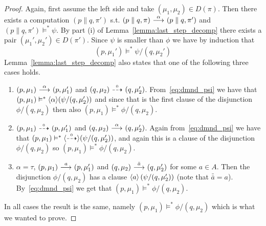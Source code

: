 \begin{proof}
    \par\nobreak
    \ltr Again, first assume the left side and take $(\mu_1,\mu_2)\in D(\pi)$. Then
    there exists a computation $(p\parallel q, \pi')$ s.t. $(p\parallel q, \pi) \ {\stackrel{{\alpha}}{\longrightarrow}}\ 
    (p\parallel q, \pi')$ and $(p\parallel q, \pi') \vDash^* \psi$.
    By part (i) of
    Lemma~\ref{lemma:last_step_decomp} there exists a pair $(\mu_1',\mu_2')\in D(\pi')$.
    Since $\psi$ is smaller than $\phi$ we have by induction that
    \begin{equation}\label{eq:dmnd_psi}
        (p,\mu_1') \vDash^* \psi / (q,\mu_2')
    \end{equation}
    Lemma~\ref{lemma:last_step_decomp} also states that one of the following three cases holds.
    \begin{enumerate}
        \item $(p,\mu_1)\ {\stackrel{{\alpha}}{\longrightarrow}}\ (p,\mu_1')$ and $(q,\mu_2)\ {\stackrel{_{0}}{\dashrightarrow}}\ (q,\mu_2')$.
            From~\eqref{eq:dmnd_psi} we have that $(p,\mu_1) \vDash^*
            \mbox{\ensuremath{\langle \alpha \rangle}}(\psi/(q,\mu_2'))$ and since that is the first clause of the
            disjunction $\phi/(q,\mu_2)$ then also $(p,\mu_1) \vDash^* \phi/(q,\mu_2)$.
        \item $(p,\mu_1)\ {\stackrel{_{0}}{\dashrightarrow}}\ (p,\mu_1')$ and $(q,\mu_2)\ {\stackrel{{\alpha}}{\longrightarrow}}\ (q,\mu_2')$.
            Again from~\eqref{eq:dmnd_psi} we have that $(p,\mu_1) \vDash^*
            \mbox{\ensuremath{\langle\stackrel{_{0}}{\dashrightarrow}\rangle}}(\psi/(q,\mu_2'))$, and again this is a clause of the disjunction
            $\phi/(q,\mu_2)$ so $(p,\mu_1) \vDash^* \phi/(q,\mu_2)$.
        \item $\alpha = \tau$, $(p,\mu_1) \ {\stackrel{{a}}{\longrightarrow}}\  (p,\mu_1')$ and $(q,\mu_2)
            \ {\stackrel{{\bar{a}}}{\longrightarrow}}\  (q,\mu_2')$ for some $a\in A$. Then the disjunction
            $\phi/(q,\mu_2)$ has a clause $\mbox{\ensuremath{\langle a \rangle}}\left( \psi / (q,\mu_2') \right)$
            (note that $\bar{\bar{a}} = a$). By~\eqref{eq:dmnd_psi} we get that
            $(p,\mu_1) \vDash^* \phi / (q,\mu_2)$.
    \end{enumerate}
    In all cases the result is the same, namely $(p,\mu_1) \vDash^* \phi / (q,\mu_2)$
    which is what we wanted to prove.


\end{proof}
